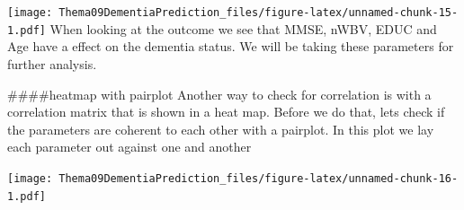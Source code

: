 \documentclass[
]{article}
\newenvironment{Shaded}{\begin{snugshade}}{\end{snugshade}}
\newcommand{\AttributeTok}[1]{\textcolor[rgb]{0.77,0.63,0.00}{#1}}
\newcommand{\DecValTok}[1]{\textcolor[rgb]{0.00,0.00,0.81}{#1}}
\newcommand{\FloatTok}[1]{\textcolor[rgb]{0.00,0.00,0.81}{#1}}
\newcommand{\FunctionTok}[1]{\textcolor[rgb]{0.00,0.00,0.00}{#1}}
\newcommand{\NormalTok}[1]{#1}
\newcommand{\OtherTok}[1]{\textcolor[rgb]{0.56,0.35,0.01}{#1}}
\newcommand{\SpecialCharTok}[1]{\textcolor[rgb]{0.00,0.00,0.00}{#1}}
\newcommand{\StringTok}[1]{\textcolor[rgb]{0.31,0.60,0.02}{#1}}
\begin{document}
\texttt{[image: Thema09DementiaPrediction\_files/figure-latex/unnamed-chunk-15-1.pdf]}
When looking at the outcome we see that MMSE, nWBV, EDUC and Age have a
effect on the dementia status. We will be taking these parameters for
further analysis.

\#\#\#\#heatmap with pairplot Another way to check for correlation is
with a correlation matrix that is shown in a heat map. Before we do
that, lets check if the parameters are coherent to each other with a
pairplot. In this plot we lay each parameter out against one and another

\begin{Shaded}
\end{Shaded}

\texttt{[image: Thema09DementiaPrediction\_files/figure-latex/unnamed-chunk-16-1.pdf]}

\begin{Shaded}
\end{Shaded}
\end{document}
